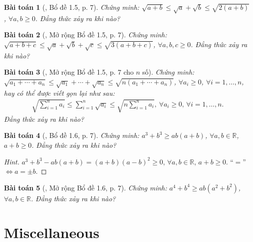 \documentclass{article}
\newtheorem{baitoan}{Bài toán}
\begin{document}
\begin{baitoan}[\cite{Son_Nghiep_Trung_Can2021}, Bổ đề 1.5, p. 7]
	Chứng minh: $\sqrt{a + b}\le\sqrt{a} + \sqrt{b}\le\sqrt{2(a + b)}$, $\forall a,b\ge 0$. Đẳng thức xảy ra khi nào?
\end{baitoan}

\begin{baitoan}[\cite{Son_Nghiep_Trung_Can2021}, Mở rộng Bổ đề 1.5, p. 7]
	Chứng minh: $\sqrt{a + b + c}\le\sqrt{a} + \sqrt{b} + \sqrt{c}\le\sqrt{3(a + b + c)}$, $\forall a,b,c\ge 0$. Đẳng thức xảy ra khi nào?
\end{baitoan}

\begin{baitoan}[\cite{Son_Nghiep_Trung_Can2021}, Mở rộng Bổ đề 1.5, p. 7 cho $n$ số]
	Chứng minh: $\sqrt{a_1 + \cdots + a_n}\le\sqrt{a_1} + \cdots + \sqrt{a_n}\le\sqrt{n(a_1 + \cdots + a_n)}$, $\forall a_i\ge 0$, $\forall i = 1,\ldots,n$, hay có thể được viết gọn lại như sau:
	\begin{align*}
		\sqrt{\sum_{i=1}^n a_i}\le\sum_{i=1}^n \sqrt{a_i}\le\sqrt{n\sum_{i=1}^n a_i},\ \forall a_i\ge 0,\,\forall i = 1,\ldots,n.
	\end{align*}
	Đẳng thức xảy ra khi nào?
\end{baitoan}

\begin{baitoan}[\cite{Son_Nghiep_Trung_Can2021}, Bổ đề 1.6, p. 7]
	Chứng minh: $a^3 + b^3\ge ab(a + b)$, $\forall a,b\in\mathbb{R}$, $a + b\ge 0$. Đẳng thức xảy ra khi nào?
\end{baitoan}

\begin{proof}[Hint]
	$a^3 + b^3 - ab(a + b) = (a + b)(a - b)^2\ge 0$, $\forall a,b\in\mathbb{R}$, $a + b\ge 0$. ``$=$'' $\Leftrightarrow a = \pm b$.
\end{proof}

\begin{baitoan}[\cite{Son_Nghiep_Trung_Can2021}, Mở rộng Bổ đề 1.6, p. 7]
	Chứng minh: $a^4 + b^4\ge ab(a^2 + b^2)$, $\forall a,b\in\mathbb{R}$. Đẳng thức xảy ra khi nào?
\end{baitoan}


\section{Miscellaneous}


\printbibliography[heading=bibintoc]
	
\end{document}
